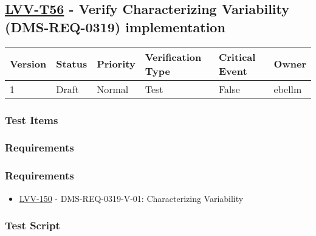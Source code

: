 \hypertarget{lvv-t56---verify-characterizing-variability-dms-req-0319-implementation}{%
\subsection{\texorpdfstring{\href{https://jira.lsstcorp.org/secure/Tests.jspa\#/testCase/LVV-T56}{LVV-T56}
- Verify Characterizing Variability (DMS-REQ-0319)
implementation}{LVV-T56 - Verify Characterizing Variability (DMS-REQ-0319) implementation}}\label{lvv-t56---verify-characterizing-variability-dms-req-0319-implementation}}

\begin{longtable}[]{@{}llllll@{}}
\toprule
Version & Status & Priority & Verification Type & Critical Event &
Owner\tabularnewline
\midrule
\endhead
1 & Draft & Normal & Test & False & ebellm\tabularnewline
\bottomrule
\end{longtable}

\hypertarget{test-items-5}{%
\subsubsection{Test Items}\label{test-items-5}}

\hypertarget{requirements-10}{%
\subsubsection{Requirements}\label{requirements-10}}

\hypertarget{requirements-11}{%
\subsubsection{Requirements}\label{requirements-11}}

\begin{itemize}
\tightlist
\item
  \href{https://jira.lsstcorp.org/browse/LVV-150}{LVV-150} -
  DMS-REQ-0319-V-01: Characterizing Variability
\end{itemize}

\hypertarget{test-script-5}{%
\subsubsection{Test Script}\label{test-script-5}}


